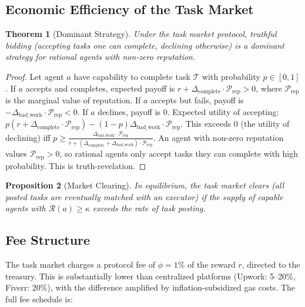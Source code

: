 \documentclass[conference]{IEEEtran}
\newtheorem{theorem}{Theorem}
\newtheorem{proposition}[theorem]{Proposition}
\begin{document}
\subsection{Economic Efficiency of the Task Market}

\begin{theorem}[Dominant Strategy]
Under the task market protocol, truthful bidding (accepting tasks one can complete, declining otherwise) is a dominant strategy for rational agents with non-zero reputation.
\end{theorem}

\begin{proof}
Let agent $a$ have capability to complete task $\mathcal{T}$ with probability $p \in [0,1]$. If $a$ accepts and completes, expected payoff is $r + \Delta_{\text{complete}} \cdot \mathcal{P}_{\text{rep}} > 0$, where $\mathcal{P}_{\text{rep}}$ is the marginal value of reputation. If $a$ accepts but fails, payoff is $-\Delta_{\text{bad\_work}} \cdot \mathcal{P}_{\text{rep}} < 0$. If $a$ declines, payoff is $0$. Expected utility of accepting: $p(r + \Delta_{\text{complete}} \cdot \mathcal{P}_{\text{rep}}) - (1-p)\Delta_{\text{bad\_work}} \cdot \mathcal{P}_{\text{rep}}$. This exceeds $0$ (the utility of declining) iff $p \geq \frac{\Delta_{\text{bad\_work}} \cdot \mathcal{P}_{\text{rep}}}{r + (\Delta_{\text{complete}} + \Delta_{\text{bad\_work}}) \cdot \mathcal{P}_{\text{rep}}}$. An agent with non-zero reputation values $\mathcal{P}_{\text{rep}} > 0$, so rational agents only accept tasks they can complete with high probability. This is truth-revelation.
\end{proof}

\begin{proposition}[Market Clearing]
In equilibrium, the task market clears (all posted tasks are eventually matched with an executor) if the supply of capable agents with $\mathcal{R}(a) \geq \kappa$ exceeds the rate of task posting.
\end{proposition}

\subsection{Fee Structure}

The task market charges a protocol fee of $\phi = 1\%$ of the reward $r$, directed to the treasury. This is substantially lower than centralized platforms (Upwork: 5--20\%, Fiverr: 20\%), with the difference amplified by inflation-subsidized gas costs. The full fee schedule is:
\end{document}

